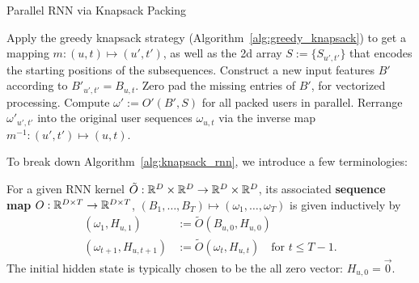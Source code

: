 \begin{algorithm}[t]
\caption{Parallel RNN via Knapsack Packing}
\label{alg:knapsack_rnn}
\begin{algorithmic}[1]
\STATE Apply the greedy knapsack strategy (Algorithm~\ref{alg:greedy_knapsack}) to get a mapping $m: (u, t) \mapsto (u', t')$, as well as the 2d array $S := \{S_{u', t'}\}$ that encodes the starting positions of the subsequences.
\STATE Construct a new input features $B'$ according to $B'_{u', t'} = B_{u, t}$.
\STATE Zero pad the missing entries of $B'$, for vectorized processing.
\STATE Compute $\omega' := O'(B', S)$ for all packed users in parallel.
\STATE Rerrange $\omega'_{u', t'}$ into the original user sequences $\omega_{u, t}$ via the inverse map $m^{-1}: (u', t') \mapsto (u, t)$.
\end{algorithmic}
\end{algorithm}
To break down Algorithm~\ref{alg:knapsack_rnn}, we introduce a few terminologies:
\begin{definition}
For a given RNN kernel $\tilde{O}: \mathbb{R}^D \times \mathbb{R}^D \to \mathbb{R}^D \times \mathbb{R}^D$, its associated \textbf{sequence map} $O: \mathbb{R}^{D \times T} \to \mathbb{R}^{D \times T}$, $(B_1, \ldots, B_T) \mapsto (\omega_1, \ldots, \omega_T)$ is given inductively by 
\begin{align*}
    (\omega_1, H_{u, 1}) &:= \tilde{O}(B_{u, 0}, H_{u, 0}) \\
    (\omega_{t+1}, H_{u, t+1})  &:= \tilde{O}(\omega_t, H_{u, t}) \quad \text{for } t \leq T -1.
\end{align*}
The initial hidden state is typically chosen to be the all zero vector: $H_{u, 0} = \vec{0}$.
\end{definition}


